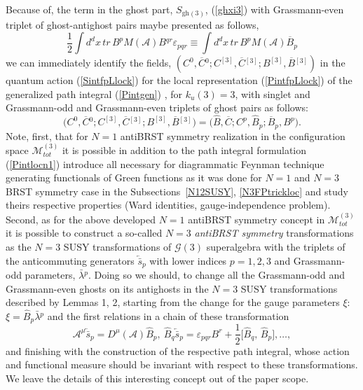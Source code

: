 \documentclass[10pt]{article}
\begin{document}
  Because of, the term  in the ghost part, $S_{\mathrm{gh}(3)}$, (\ref{ghxi3}) with Grassmann-even triplet of ghost-antighost pairs  maybe presented as follows,
    \begin{equation}\label{Gegh}
  \frac{1}{2}\int d^dx\,  tr\, B^pM(\mathcal{A}) {B}{}^{qr}\varepsilon_{pqr} \equiv \int d^dx\,  tr\, B^pM(\mathcal{A}) \overline{B}_p
 \end{equation}
 we can immediately identify the fields, $(C^0, \overline{C}{}^0; C^{[3]}, \overline{C}{}^{[3]}; B^{[3]}, \overline{B}{}^{[3]})$ in the quantum action  (\ref{SintfpLlock}) for the local representation (\ref{PintfpLlock}) of the generalized  path integral (\ref{Pintgen}) ,  for $k_u(3)=3$,
 with singlet and Grassmann-odd and Grassmann-even triplets of ghost pairs as follows:
 \begin{equation}\label{identifgh}
   \big(C^0, \overline{C}{}^0; C^{[3]}, \overline{C}{}^{[3]}; B^{[3]}, \overline{B}{}^{[3]}\big) =  \big(\widehat{B}, \overline{C}; C^{p}, \widehat{B}_p;   \overline{B}_{p}, B^{p}\big).
 \end{equation}
 Note, first, that for  $N=1$ antiBRST symmetry realization in the  configuration space $\mathcal{M}^{(3)}_{tot}$  it is possible in addition to the path integral formulation (\ref{Pintlocn1}) introduce all necessary for diagrammatic Feynman technique generating functionals of Green functions  as it was done for $   N=1$ and $N=3$ BRST symmetry case in the Subsections~\ref{N12SUSY}, \ref{N3FPtrickloc} and study theirs respective properties (Ward identities, gauge-independence problem).
 Second, as for the above developed $N=1$ antiBRST symmetry concept in  $\mathcal{M}^{(3)}_{tot}$ it is possible to construct  a so-called $N=3$ \emph{antiBRST symmetry} transformations as the $N=3$ SUSY transformations of $\mathcal{G}(3)$ superalgebra  with the triplets of the anticommuting  generators $\overleftarrow{\bar{s}}{}_p$ with lower indices $p=1,2,3$ and Grassmann-odd parameters, $\bar{\lambda}{}^p$. Doing so we should, to change all the Grassmann-odd and Grassmann-even ghosts on its antighosts in the $N=3$ SUSY transformations described by Lemmas 1, 2, starting from the change for the gauge parameters $\xi$:
 $\xi=\widehat{B}_p\bar{\lambda}{}^p$ and the first relations in a chain of these transformation
 \begin{equation}\label{aN3brst}
   \mathcal{A}^{\mu}\overleftarrow{\bar{s}}{}_p = D^{\mu}(\mathcal{A})\widehat{B}_p, \ \widehat{B}_q\overleftarrow{\bar{s}}{}_p= \varepsilon_{pqr}B^r +\frac{1}{2}\big[\widehat{B}_q,\,\widehat{B}_p\big] , \ldots,
    \end{equation}
    and finishing with the construction of the respective path integral, whose action and functional measure should be invariant with respect to these transformations.
   We leave the details of this interesting concept  out of the paper scope.
\end{document}
